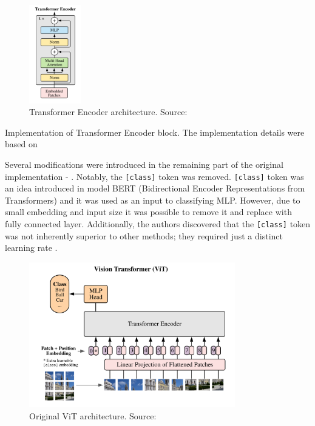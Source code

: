 \begin{figure}[H] 
  \centering     
  \includegraphics[width=0.2\textwidth]{img/transformer-encoder.png} 
  \caption{Transformer Encoder architecture. Source: \cite{vitPaper}}
  \label{fig:transformer-encoder}
\end{figure}

\newenvironment{longlistingA}{\captionsetup{type=listing, width=0.8\textwidth}}{}
\begin{longlistingA}
    \caption{Implementation of Transformer Encoder block. The implementation details were based on \cite{d2lViT}}
    \label{lst:transformer_encoder}
\end{longlistingA}

Several modifications were introduced in the remaining part of the original implementation - .
Notably, the \texttt{[class]} token was removed.
\texttt{[class]} token was an idea introduced in model BERT (Bidirectional Encoder Representations from Transformers) \cite{bertOriginal} and it was used as an input to classifying MLP.
However, due to small embedding and input size it was possible to remove it and replace with fully connected layer.
Additionally, the authors discovered that the \texttt{[class]} token was not inherently superior to other methods; they required just a distinct learning rate \cite{vitPaper}.
\begin{figure}[H] 
  \centering     
  \includegraphics[width=0.8\textwidth]{img/original_vit.png} 
  \caption{Original ViT architecture. Source: \cite{vitPaper}}
  \label{fig:original-vit-architecture}
\end{figure}


